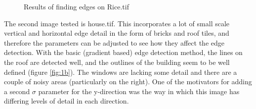 \documentclass[a4paper]{article}
\begin{document}
\begin{figure}
\begin{subfigure}[b]{0.3\textwidth}
        \end{subfigure}
        
        \caption{Results of finding edges on Rice.tif}        
        \label{fig:rice}
\end{figure}

The second image tested is house.tif. This incorporates a lot of small scale vertical and horizontal edge detail in the form of bricks and roof tiles, and therefore the parameters can be adjusted to see how they affect the edge detection.
With the basic (gradient based) edge detection method, the lines on the roof are detected well, and the outlines of the building seem to be well defined (figure \ref{fig:1b}). The windows are lacking some detail and there are a couple of noisy areas (particularly on the right). One of the motivators for adding a second $\sigma$ parameter for the y-direction was the way in which this image has differing levels of detail in each direction.
\end{document}
